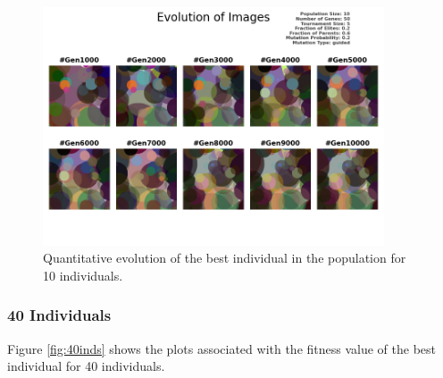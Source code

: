 \documentclass{assignment}
\begin{document}
\begin{figure}[!htb]
    \centering
    \includegraphics[width=0.9\textwidth]{figures/images_output_10_50_5_0.2_0.6_0.2_guided.png}
    \caption{Quantitative evolution of the best individual in the population for 10 individuals.}
    \label{fig:10inds_image}
\end{figure}

\subsubsection{40 Individuals}

Figure \ref{fig:40inds} shows the plots associated with the fitness value of the best individual for 40 individuals.
\end{document}
